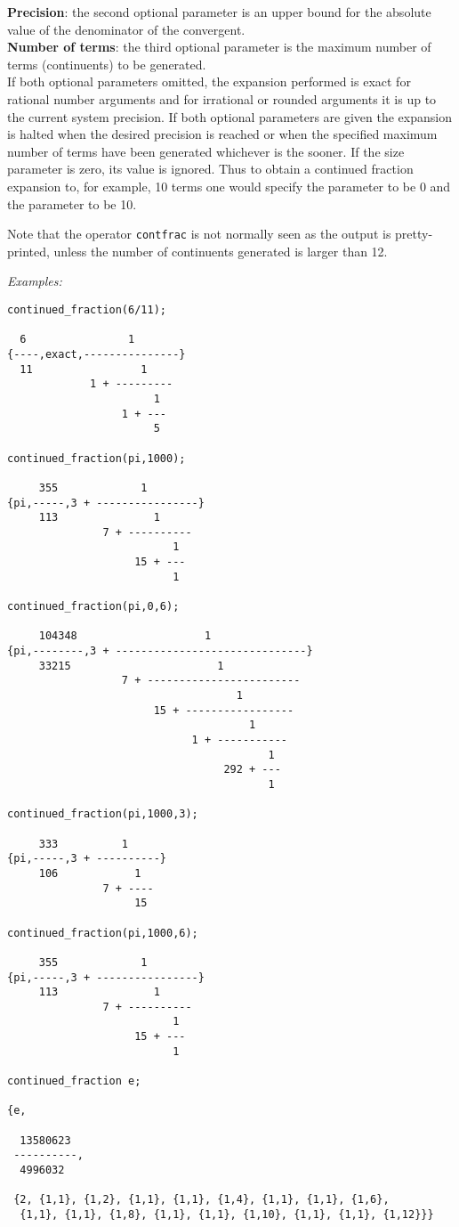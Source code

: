 \textbf{Precision}: the second optional parameter  is an upper
bound for the absolute value of the  denominator of the convergent.\\
\textbf{Number of terms}: the third optional parameter  is
the maximum number of terms (continuents) to be generated.\\
If both optional parameters omitted, the expansion performed is exact for
rational number arguments and for irrational or rounded arguments it is up
to the current system precision.
If both optional parameters are given the expansion is halted when the desired
precision is reached or when the specified maximum number of terms have 
been generated whichever is the sooner. If the size parameter is zero,
its value is ignored.  Thus to obtain a continued fraction expansion to,
for example, 10 terms one would specify the  parameter to be 0 and
the  parameter to be 10.

Note that the operator \texttt{contfrac} is not normally seen as the output
is pretty-printed, unless the number of continuents generated is larger
than 12.

\textit{Examples:}
\begin{verbatim}
continued_fraction(6/11);

  6                1
{----,exact,---------------}
  11                 1
             1 + ---------
                       1
                  1 + ---
                       5

continued_fraction(pi,1000);

     355             1
{pi,-----,3 + ----------------}
     113               1
               7 + ----------
                          1
                    15 + ---
                          1

continued_fraction(pi,0,6);

     104348                    1
{pi,--------,3 + ------------------------------}
     33215                       1
                  7 + ------------------------
                                    1
                       15 + -----------------
                                      1
                             1 + -----------
                                         1
                                  292 + ---
                                         1

continued_fraction(pi,1000,3);

     333          1
{pi,-----,3 + ----------}
     106            1
               7 + ----
                    15

continued_fraction(pi,1000,6);

     355             1
{pi,-----,3 + ----------------}
     113               1
               7 + ----------
                          1
                    15 + ---
                          1

continued_fraction e;

{e,

  13580623
 ----------,
  4996032

 {2, {1,1}, {1,2}, {1,1}, {1,1}, {1,4}, {1,1}, {1,1}, {1,6},
  {1,1}, {1,1}, {1,8}, {1,1}, {1,1}, {1,10}, {1,1}, {1,1}, {1,12}}}
\end{verbatim}


